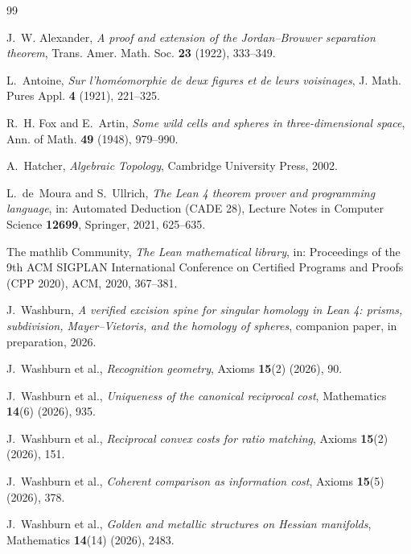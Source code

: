 \documentclass[11pt]{article}
\theoremstyle{definition}
\begin{document}
\begin{thebibliography}{99}

J.~W. Alexander,
\emph{A proof and extension of the Jordan--Brouwer separation theorem},
Trans. Amer. Math. Soc. \textbf{23} (1922), 333--349.

L.~Antoine,
\emph{Sur l'hom\'eomorphie de deux figures et de leurs voisinages},
J. Math. Pures Appl. \textbf{4} (1921), 221--325.

R.~H. Fox and E.~Artin,
\emph{Some wild cells and spheres in three-dimensional space},
Ann. of Math. \textbf{49} (1948), 979--990.

A.~Hatcher,
\emph{Algebraic Topology},
Cambridge University Press, 2002.

L.~de~Moura and S.~Ullrich,
\emph{The Lean 4 theorem prover and programming language},
in: Automated Deduction (CADE 28), Lecture Notes in Computer Science \textbf{12699}, Springer, 2021, 625--635.

The mathlib Community,
\emph{The Lean mathematical library},
in: Proceedings of the 9th ACM SIGPLAN International Conference on Certified Programs and Proofs (CPP 2020), ACM, 2020, 367--381.

J.~Washburn,
\emph{A verified excision spine for singular homology in Lean 4: prisms, subdivision, Mayer--Vietoris, and the homology of spheres},
companion paper, in preparation, 2026.

J.~Washburn et al.,
\emph{Recognition geometry},
Axioms \textbf{15}(2) (2026), 90.

J.~Washburn et al.,
\emph{Uniqueness of the canonical reciprocal cost},
Mathematics \textbf{14}(6) (2026), 935.

J.~Washburn et al.,
\emph{Reciprocal convex costs for ratio matching},
Axioms \textbf{15}(2) (2026), 151.

J.~Washburn et al.,
\emph{Coherent comparison as information cost},
Axioms \textbf{15}(5) (2026), 378.

J.~Washburn et al.,
\emph{Golden and metallic structures on Hessian manifolds},
Mathematics \textbf{14}(14) (2026), 2483.

\end{thebibliography}
\end{document}
